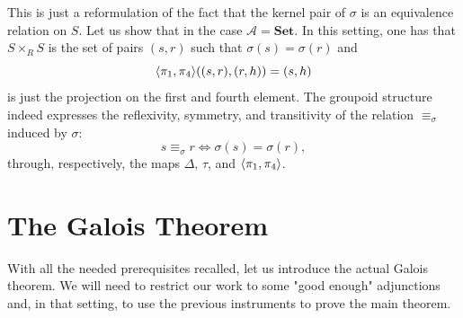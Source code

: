 \begin{oss*}
    This is just a reformulation of the fact that the kernel pair of $\sigma$ is an equivalence relation on $S$. Let us show that in the case $\mathcal{A}=\textbf{Set}$. In this setting, one has that $S\times_RS$ is the set of pairs $(s,r)$ such that $\sigma(s)=\sigma(r)$ and 
    \[ \langle{\pi_1},{\pi_4}\rangle((s,r),(r,h)) = (s,h) \]
    is just the projection on the first and fourth element.
    The groupoid structure indeed expresses the reflexivity, symmetry, and transitivity of the relation $\equiv_\sigma$ induced by $\sigma$:
    \[ s\equiv_\sigma r \iff \sigma(s) = \sigma(r), \]
    through, respectively, the maps $\Delta$, $\tau$, and $\langle{\pi_1},{\pi_4}\rangle$.
\end{oss*}



\section{The Galois Theorem}
\label{sec:galois_theorem}

With all the needed prerequisites recalled, let us introduce the actual Galois theorem. We will need to restrict our work to some "good enough" adjunctions and, in that setting, to use the previous instruments to prove the main theorem.

